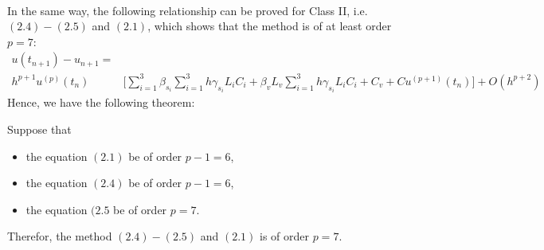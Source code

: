 ‎\documentclass[a4paper,10pt]{article}‎
\begin{document}
\noindent
In the same way, the following relationship can be proved for  Class II, i.e. $(2.4)-(2.5)$ and $(2.1)$, which shows that the method is of at least order $p=7$:
\begin{align*}\label{}
  u(t_{n+1}) -u_{n+1}=&\\
   h^{p+1}u^{(p)}(t_{n})&\bigg[\sum_{i=1}^{3}\beta_{s_{i}}\sum_{i=1}^{3}h\gamma_{s_{i}}L_{i}C_{i} +\beta_{v}L_{v}\sum_{i=1}^{3}h\gamma_{s_{i}}L_{i}C_{i}+C_{v} 
 +Cu^{(p+1)}(t_{n})\bigg]+O(h^{p+2}) 
\end{align*}
Hence, we have the following theorem:
\begin{theorem}\label{thm1}
 Suppose  that
\begin{itemize}
  \item the equation $(2.1)$ be of order $p-1=6$,
  \item  the equation $(2.4)$ be of order $p-1=6$,
\item  the equation $(2.5$ be of order $p=7$.
\end{itemize}
Therefor, the   method $(2.4)-(2.5)$  and $(2.1)$ is of order   $p=7$.
\end{theorem}
\vspace{0.1 cm}
\end{document}
